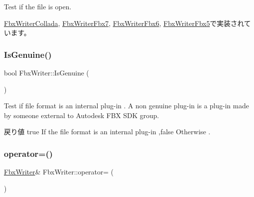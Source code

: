 Test if the file is open. 

\hyperlink{class_fbx_writer_collada_a77c117aa61d57faf57e6810823938cbd}{Fbx\+Writer\+Collada}, \hyperlink{class_fbx_writer_fbx7_ad9f82dc72129c63eda20dcccda7db53b}{Fbx\+Writer\+Fbx7}, \hyperlink{class_fbx_writer_fbx6_ada26031c01e10e3f54431739e9286d64}{Fbx\+Writer\+Fbx6}, \hyperlink{class_fbx_writer_fbx5_abe979bfdd626bd8b222a8385e6529a47}{Fbx\+Writer\+Fbx5}で実装されています。

\mbox{\label{class_fbx_writer_a030c374bcc699993ea32225a4624532a}} 
\subsubsection{\texorpdfstring{Is\+Genuine()}{IsGenuine()}}
{\footnotesize\ttfamily bool Fbx\+Writer\+::\+Is\+Genuine (\begin{DoxyParamCaption}{ }\end{DoxyParamCaption})}

Test if file format is an internal plug-\/in . A non genuine plug-\/in is a plug-\/in made by someone external to Autodesk F\+BX S\+DK group. \begin{DoxyReturn}{戻り値}
{\ttfamily true} If the file format is an internal plug-\/in ,{\ttfamily false} Otherwise . 
\end{DoxyReturn}
\mbox{\label{class_fbx_writer_a7f56d9a174cfde0ab7815135b2c5f3c1}} 
\subsubsection{\texorpdfstring{operator=()}{operator=()}}
{\footnotesize\ttfamily \hyperlink{class_fbx_writer}{Fbx\+Writer}\& Fbx\+Writer\+::operator= (\begin{DoxyParamCaption}\item[{\hyperlink{class_fbx_writer}{Fbx\+Writer} const \&}]{ }\end{DoxyParamCaption})\hspace{0.3cm}{\ttfamily [protected]}}

\mbox{\label{class_fbx_writer_aeca3bf711e9fb1815c90b3423773010d}} 
